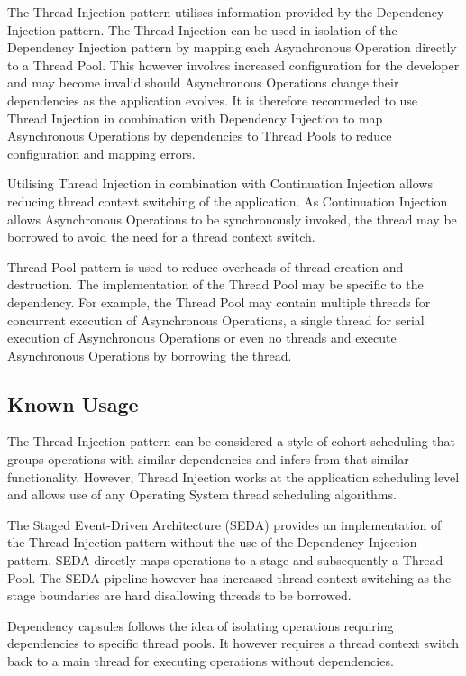\documentclass[prodmode]{style/acmlarge}
\begin{document}
The Thread Injection pattern utilises information provided by the Dependency
Injection pattern.  The Thread Injection can be used in isolation of the
Dependency Injection pattern by mapping each Asynchronous Operation directly to
a Thread Pool.  This however involves increased configuration for the developer
and may become invalid should Asynchronous Operations change their dependencies
as the application evolves.  It is therefore recommeded to use Thread Injection
in combination with Dependency Injection to map Asynchronous Operations by
dependencies to Thread Pools to reduce configuration and mapping errors.

Utilising Thread Injection in combination with Continuation Injection allows
reducing thread context switching of the application.  As Continuation Injection
allows Asynchronous Operations to be synchronously invoked, the thread may be
borrowed to avoid the need for a thread context switch.

Thread Pool pattern \cite{thread-per-request} is used to reduce overheads of
thread creation and destruction.  The implementation of the Thread Pool may be
specific to the dependency.  For example, the Thread Pool may contain multiple
threads for concurrent execution of Asynchronous Operations, a single thread for
serial execution of Asynchronous Operations or even no threads and execute
Asynchronous Operations by borrowing the thread.


\subsection{Known Usage}

The Thread Injection pattern can be considered a style of cohort scheduling
\cite{cohort} that groups operations with similar dependencies and infers from
that similar functionality.  However, Thread Injection works at the application
scheduling level and allows use of any Operating System thread scheduling
algorithms.

The Staged Event-Driven Architecture (SEDA) \cite{seda} provides an
implementation of the Thread Injection pattern without the use of the Dependency
Injection pattern.  SEDA directly maps operations to a stage and subsequently a
Thread Pool.  The SEDA pipeline however has increased thread context switching
as the stage boundaries are hard disallowing threads to be borrowed.

Dependency capsules \cite{dependency-capsules} follows the idea of isolating
operations requiring dependencies to specific thread pools.  It however requires
a thread context switch back to a main thread for executing operations without
dependencies.
\end{document}
